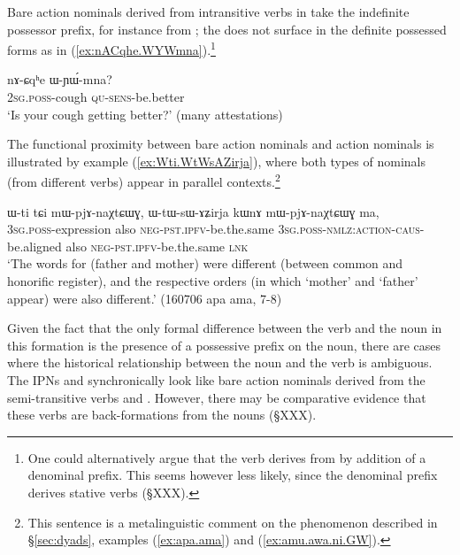 Bare action nominals derived from intransitive verbs in  take the  indefinite possessor prefix, for instance  from ; the  does not surface in the definite possessed forms as in (\ref{ex:nACqhe.WYWmna}).\footnote{One could alternatively argue that the verb  derives from   by addition of a denominal prefix. This seems however less likely, since the denominal  prefix derives stative verbs (§XXX). }

\begin{exe}
\ex \label{ex:nACqhe.WYWmna}
\gll nɤ-ɕqʰe ɯ-ɲɯ́-mna? \\
\textsc{2sg}.\textsc{poss}-cough \textsc{qu}-\textsc{sens}-be.better \\
\glt `Is your cough getting better?' (many attestations)
\end{exe}

The functional proximity between bare action nominals and  action nominals is illustrated by example (\ref{ex:Wti.WtWsAZirja}), where both types of nominals (from different verbs) appear in parallel contexts.\footnote{This sentence is a metalinguistic comment on the phenomenon described in §\ref{sec:dyads}, examples (\ref{ex:apa.ama}) and (\ref{ex:amu.awa.ni.GW}). }

\begin{exe}
\ex \label{ex:Wti.WtWsAZirja}
\gll  ɯ-ti tɕi mɯ-pjɤ-naχtɕɯɣ, ɯ-tɯ-sɯ-ɤʑirja kɯnɤ mɯ-pjɤ-naχtɕɯɣ ma, \\
\textsc{3sg}.\textsc{poss}-expression also \textsc{neg}-\textsc{pst}.\textsc{ipfv}-be.the.same \textsc{3sg}.\textsc{poss}-\textsc{nmlz}:\textsc{action}-\textsc{caus}-be.aligned also \textsc{neg}-\textsc{pst}.\textsc{ipfv}-be.the.same \textsc{lnk} \\
\glt `The words for (father and mother) were different (between common and honorific register), and the respective orders (in which `mother' and `father' appear) were also different.'  (160706 apa ama, 7-8)
\end{exe}

Given the fact that the only formal difference between the verb and the noun in this formation is the presence of a possessive prefix on the noun, there are cases where the historical relationship between the noun and the verb is ambiguous. The IPNs  and  synchronically look like bare action nominals derived from the semi-transitive verbs  and . However, there may be comparative evidence that these verbs are back-formations from the nouns (§XXX).


